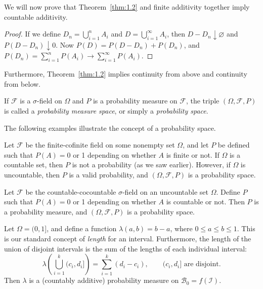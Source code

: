 \documentclass[11pt,fleqn]{book} %
\begin{document}
We will now prove that Theorem~\ref{thm:1.2} and finite additivity together imply countable additivity.

\begin{proof}
	If we define $D_n = \bigcup_{i=1}^n A_i$ and $D = \bigcup_{i=1}^\infty A_i$, then $D - D_n \downarrow \varnothing$ and $P(D-D_n) \downarrow 0$. Now $P(D) = P(D-D_n) + P(D_n)$, and $P(D_n) = \sum_{i=1}^n P(A_i) \rightarrow \sum_{i=1}^\infty P(A_i)$.
\end{proof}

Furthermore, Theorem~\ref{thm:1.2} implies continuity from above and continuity from below.

\begin{definition} \label{def:probability-space}
	If $\mathcal{F}$ is a $\sigma$-field on $\Omega$ and $P$ is a probability measure on $\mathcal{F}$, the triple $(\Omega,\mathcal{F},P)$ is called a \emph{probability measure space}, or simply a \emph{probability space}.
\end{definition}

The following examples illustrate the concept of a probability space.

\begin{example} \label{ex:1.4}
	Let $\mathcal{F}$ be the finite-cofinite field on some nonempty set $\Omega$, and let $P$ be defined such that $P(A) = 0$ or 1 depending on whether $A$ is finite or not. If $\Omega$ is a countable set, then $P$ is not a probability (as we saw earlier). However, if $\Omega$ is uncountable, then $P$ is a valid probability, and $(\Omega,\mathcal{F},P)$ is a probability space.
\end{example}

\begin{example} \label{ex:1.5}
	Let $\mathcal{F}$ be the countable-cocountable $\sigma$-field on an uncountable set $\Omega$. Define $P$ such that $P(A) = 0$ or 1 depending on whether $A$ is countable or not. Then $P$ is a probability measure, and $(\Omega,\mathcal{F},P)$ is a probability space.
\end{example}

\begin{example} \label{ex:1.6}
	Let $\Omega = (0,1]$, and define a function $\lambda(a,b) = b-a$, where $0 \leq a \leq b \leq 1$. This is our standard concept of \emph{length} for an interval. Furthermore, the length of the union of disjoint intervals is the sum of the lengths of each individual interval:
	\[
		\lambda \left( \bigcup_{i=1}^k (c_i,d_i] \right) = \sum_{i=1}^k (d_i-c_i), \qquad \textrm{$(c_i,d_i]$ are disjoint}.
	\]
	Then $\lambda$ is a (countably additive) probability measure on $\mathcal{B}_0 = f(\mathcal{I})$.
\end{example}
\end{document}
